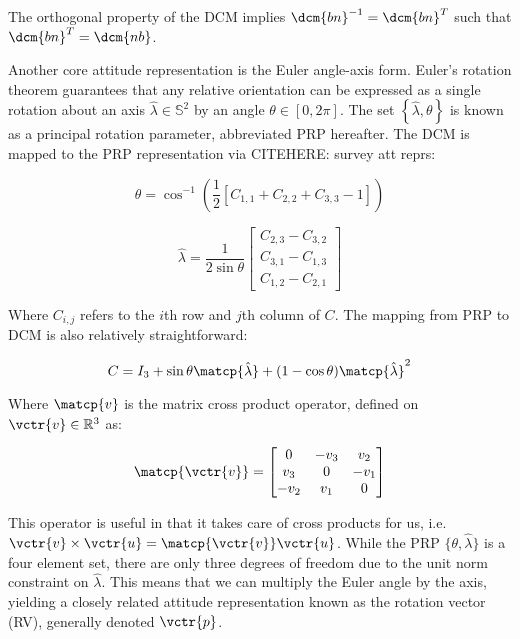 The orthogonal property of the DCM implies $\dcm{bn}^{-1} = \dcm{bn}^T$ such that $\dcm{bn}^T = \dcm{nb}$. 

Another core attitude representation is the Euler angle-axis form. Euler's rotation theorem guarantees that any relative orientation can be expressed as a single rotation about an axis $\hat{\lambda} \in \mathbb{S}^2$ by an angle $\theta \in [0, 2\pi]$. The set $\left\{\hat{\lambda},\theta\right\}$ is known as a principal rotation parameter, abbreviated PRP hereafter. The DCM is mapped to the PRP representation via CITEHERE: survey att reprs:

\begin{equation}
    \theta = \cos^{-1}\left(\frac{1}{2} \left[C_{1,1} + C_{2,2} + C_{3,3} - 1 \right] \right)
\end{equation}

\begin{equation}
    \hat{\lambda} = \frac{1}{2\sin{\theta}} 
    \begin{bmatrix} C_{2,3} - C_{3,2} \\ C_{3,1}-C_{1,3} \\ C_{1,2} - C_{2,1}\end{bmatrix}
\end{equation}

Where $C_{i,j}$ refers to the $i$th row and $j$th column of $C$. The mapping from PRP to DCM is also relatively straightforward:

\begin{equation}
    C = I_3 + \sin\theta\matcp{\hat{\lambda}} + (1-\cos\theta)\matcp{\hat{\lambda}}^2
\end{equation}

Where $\matcp{v}$ is the matrix cross product operator, defined on $\vctr{v} \in \mathbb{R}^3$ as:

\begin{equation}
    \matcp{\vctr{v}} = \begin{bmatrix}
        0 & -v_3 & v_2 \\
        v_3 & 0 & -v_1 \\
        -v_2 & v_1 & 0
    \end{bmatrix}
\end{equation}

This operator is useful in that it takes care of cross products for us, i.e. $\vctr{v} \times \vctr{u} = \matcp{\vctr{v}}\vctr{u}$. While the PRP $\{\theta, \hat{\lambda}\}$ is a four element set, there are only three degrees of freedom due to the unit norm constraint on $\hat{\lambda}$. This means that we can multiply the Euler angle by the axis, yielding a closely related attitude representation known as the rotation vector (RV), generally denoted $\vctr{p}$. 


